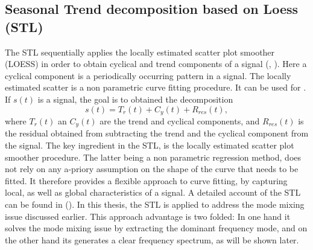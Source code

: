 \documentclass[../Main/thesis.tex]{subfiles}
\begin{document}
\justify
\subsection{Seasonal Trend decomposition based on Loess (STL)}
The STL sequentially applies the locally estimated scatter plot smoother (LOESS) in order to obtain cyclical and trend components of a signal (\cite{Cleveland-1979}, \cite{Cleveland-et-al-1988}). Here a cyclical component is a periodically occurring pattern in a signal. The  locally estimated scatter is a non parametric curve fitting procedure.  It can be used for .
If $s(t)$ is a signal, the goal is to obtained the decomposition 
\begin{equation}
s(t) = T_{r}(t) + C_{y}(t) + R_{res}(t),
\end{equation} 
where $T_{r}(t)$ an $C_{y}(t)$ are the trend and cyclical components, and $R_{res}(t)$ is the residual obtained from subtracting  the trend and the cyclical component from the signal. The key ingredient in the STL, is the locally estimated scatter plot smoother procedure. The latter being a non parametric regression method, does not rely on any a-priory assumption on the shape of the curve that needs to be fitted. It therefore provides a flexible approach to curve fitting, by capturing local, as well as global characteristics of a signal. A detailed account of the STL can be found in  (\cite{Cleveland-et-al-1990}).
\justify
 In this thesis, the STL is applied to address the mode mixing issue discussed earlier. This approach advantage is two folded: In one hand it solves the mode mixing issue by extracting the dominant frequency mode, and on the other hand
  its generates a clear frequency spectrum, as will be shown later.
\end{document}
